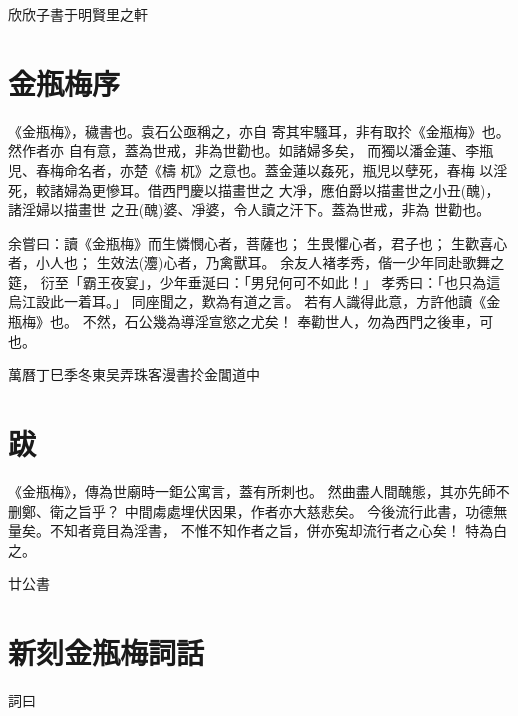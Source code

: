 \begin{showcontents}{}
{\bigskip\mbox{}\fzqiti\large\hfill 欣欣子書于明賢里之軒 \quad }






\chapter*{金瓶梅序}

《金瓶梅》，穢書也。袁石公亟稱之，亦自
寄其牢騷耳，非有取扵《金瓶梅》也。然作者亦
自有意，蓋為世戒，非為世勸也。如諸婦多矣，
而獨以潘金蓮、李瓶児、春梅命名者，亦楚《檮
杌》之意也。蓋金蓮以姦死，瓶児以孽死，春梅
以淫死，較諸婦為更慘耳。借西門慶以描畫世之
大凈，應伯爵以描畫世之小丑(醜)，諸淫婦以描畫世
之丑(醜)婆、凈婆，令人讀之汗下。蓋為世戒，非為
世勸也。

余嘗曰：讀《金瓶梅》而生憐憫心者，菩薩也；
生畏懼心者，君子也；
生歡喜心者，小人也；
生效法(灋)心者，乃禽獸耳。
余友人褚孝秀，偕一少年同赴歌舞之筵，
衍至「霸王夜宴」，少年垂涎曰：「男兒何可不如此！」
孝秀曰：「也只為這烏江設此一着耳。」
同座聞之，歎為有道之言。
若有人識得此意，方許他讀《金瓶梅》也。
不然，石公幾為導淫宣慾之尤矣！
奉勸世人，勿為西門之後車，可也。

{\bigskip\mbox{}\fzqiti\large\hfill 萬曆丁巳季冬東吴弄珠客漫書扵金閶道中 \quad}







\chapter*{跋}

《金瓶梅》，傳為世廟時一鉅公寓言，蓋有所刺也。
然曲盡人間醜態，其亦先師不删鄭、衛之旨乎？
中間䖏處埋伏因果，作者亦大慈悲矣。
今後流行此書，功德無量矣。不知者竟目為淫書，
不惟不知作者之旨，併亦寃却流行者之心矣！
特為白之。

{\bigskip\mbox{}\fzqiti\large\hfill 廿公書 \quad}





\chapter*{新刻金瓶梅詞話}

詞曰


\end{showcontents}

